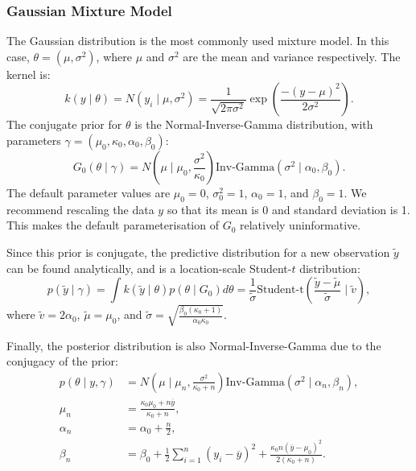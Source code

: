 \documentclass[nojss]{jss}
\begin{document}
\subsubsection{Gaussian Mixture Model}
The Gaussian distribution is the most commonly used mixture model. In this case, $\theta = (\mu,\sigma^2)$, where $\mu$ and $\sigma^2$ are the mean and variance respectively. The kernel is:
\begin{equation*}
k(y \mid \theta) = N(y_i \mid \mu, \sigma^2) = \frac{1}{\sqrt{2\pi \sigma^2}} \exp \left( \frac{ -(y-\mu)^2}{2\sigma^2} \right).
\end{equation*}
The conjugate prior for $\theta$ is the Normal-Inverse-Gamma distribution, with parameters $\gamma = (\mu_0, \kappa_0, \alpha_0, \beta_0)$:
\begin{equation*}
G_0(\theta \mid \gamma) =  N\left(\mu \mid \mu_0, \frac{\sigma^2}{\kappa_0} \right) \text{Inv-Gamma} \left(\sigma^2 \mid \alpha_0, \beta_0 \right).
\end{equation*}
The default parameter values are $\mu_0 = 0$, $\sigma_0^2 = 1$, $\alpha_0 = 1$, and $\beta_0 = 1$.
We recommend rescaling the data $y$ so that its mean is 0 and standard deviation is 1. This makes the default parameterisation of $G_0$ relatively uninformative.

Since this prior is conjugate, the predictive distribution for a new observation $\tilde{y}$ can be found analytically, and is a location-scale Student-$t$ distribution:
\begin{equation*}
p(\tilde{y} \mid \gamma) = \int k(\tilde{y}\mid\theta) p(\theta \mid G_0) d\theta = \frac{1}{\tilde{\sigma}} \text{Student-t} \left( \frac{ \tilde{y} - \tilde{\mu}}{\tilde{\sigma}} \mid \tilde{v}\right),
\end{equation*}
where $\tilde{v} = 2 \alpha_0$, $\tilde{\mu} = \mu_0$, and $\tilde{\sigma} = \sqrt{ \frac{\beta_0 (\kappa_0 + 1)}{\alpha_0 \kappa_0}}$.

Finally, the posterior distribution is also Normal-Inverse-Gamma due to the conjugacy of the prior:
\begin{align*}
p(\theta \mid y, \gamma) & = N \left( \mu \mid \mu_n , \frac{\sigma^2}{\kappa_0 + n}  \right) \text{Inv-Gamma} \left( \sigma^2 \mid \alpha_n , \beta_n \right), \\
\mu_n & = \frac{\kappa_0 \mu_0 + n \overline{y}}{\kappa_0 + n}, \\
\alpha_n & = \alpha_0 + \frac{n}{2}, \\
\beta_n & = \beta_0 + \frac{1}{2} \sum_{i=1}^n (y_i - \overline{y})^2 + \frac{\kappa_0 n (\overline{y} - \mu_0)^2}{2(\kappa_0 + n)} .
\end{align*}
\end{document}
